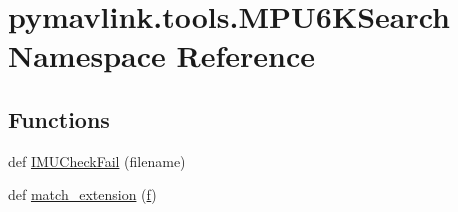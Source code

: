 \hypertarget{namespacepymavlink_1_1tools_1_1MPU6KSearch}{}\section{pymavlink.\+tools.\+M\+P\+U6\+K\+Search Namespace Reference}
\label{namespacepymavlink_1_1tools_1_1MPU6KSearch}
\subsection*{Functions}
\begin{DoxyCompactItemize}
\item 
def \mbox{\hyperlink{namespacepymavlink_1_1tools_1_1MPU6KSearch_a279d987dea7583d9f989aa9cf3e8b3b7}{I\+M\+U\+Check\+Fail}} (filename)
\item 
def \mbox{\hyperlink{namespacepymavlink_1_1tools_1_1MPU6KSearch_adb2e53c6e56de3bd2784aa39e2605d92}{match\+\_\+extension}} (\mbox{\hyperlink{namespacepymavlink_1_1tools_1_1MPU6KSearch_ac07a87a94d378396fc6958ca6fcb3064}{f}})
\end{DoxyCompactItemize}
